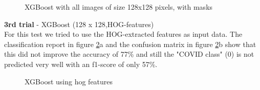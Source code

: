 \documentclass{article}
\begin{document}
\begin{figure}[!ht]
  \centering
  \qquad
  \caption{XGBoost with all images of size 128x128 pixels, with masks}
  \label{fig:XGBost_classifier_method_128_mask}
\end{figure}



\textbf{3rd trial} - XGBoost (128 x 128,HOG-features)\\
For this test we tried to use the HOG-extracted features as input data. The classification report in figure \ref{fig:XGBost_hog}a  and the confusion matrix
in figure \ref{fig:XGBost_hog}b show that this did not improve the accuracy of 77\% and still the "COVID class" (0) is not predicted very well with an f1-score of
only 57\%.

\begin{figure}[!ht]
  \centering
  \qquad
  \caption{XGBoost using hog features}
  \label{fig:XGBost_hog}
\end{figure}
\end{document}
